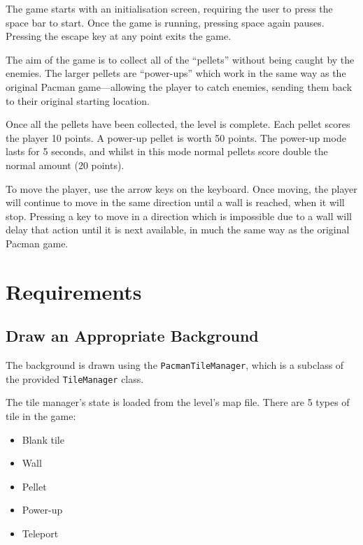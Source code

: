 \documentclass[a4paper,11pt]{article}
\begin{document}
    The game starts with an initialisation screen, requiring the user to press
    the space bar to start. Once the game is running, pressing space again
    pauses. Pressing the escape key at any point exits the game.

    The aim of the game is to collect all of the ``pellets'' without being
    caught by the enemies. The larger pellets are ``power-ups'' which work in
    the same way as the original Pacman game---allowing the player to catch
    enemies, sending them back to their original starting location.

    Once all the pellets have been collected, the level is complete. Each
    pellet scores the player 10 points. A power-up pellet is worth 50 points.
    The power-up mode lasts for 5 seconds, and whilst in this mode normal
    pellets score double the normal amount (20 points).

    To move the player, use the arrow keys on the keyboard. Once moving, the
    player will continue to move in the same direction until a wall is reached,
    when it will stop. Pressing a key to move in a direction which is
    impossible due to a wall will delay that action until it is next available,
    in much the same way as the original Pacman game.

    \newpage

    \section{Requirements}

    \subsection{Draw an Appropriate Background}

    The background is drawn using the \verb!PacmanTileManager!, which is
    a subclass of the provided \verb!TileManager! class.

    The tile manager's state is loaded from the level's map file. There are
    5 types of tile in the game:

    \begin{itemize}
        \item Blank tile
        \item Wall
        \item Pellet
        \item Power-up
        \item Teleport
    \end{itemize}
\end{document}
